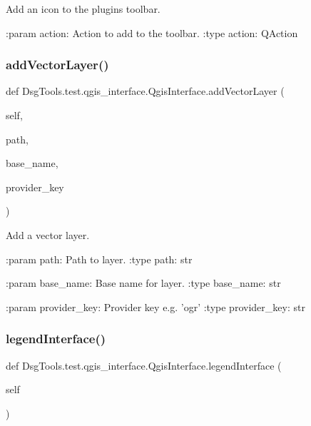 \begin{DoxyVerb}Add an icon to the plugins toolbar.

:param action: Action to add to the toolbar.
:type action: QAction
\end{DoxyVerb}
 \mbox{\label{class_dsg_tools_1_1test_1_1qgis__interface_1_1_qgis_interface_ad95653df27b570fb359d56334141ff92}} 
\subsubsection{\texorpdfstring{add\+Vector\+Layer()}{addVectorLayer()}}
{\footnotesize\ttfamily def Dsg\+Tools.\+test.\+qgis\+\_\+interface.\+Qgis\+Interface.\+add\+Vector\+Layer (\begin{DoxyParamCaption}\item[{}]{self,  }\item[{}]{path,  }\item[{}]{base\+\_\+name,  }\item[{}]{provider\+\_\+key }\end{DoxyParamCaption})}

\begin{DoxyVerb}Add a vector layer.

:param path: Path to layer.
:type path: str

:param base_name: Base name for layer.
:type base_name: str

:param provider_key: Provider key e.g. 'ogr'
:type provider_key: str
\end{DoxyVerb}
 \mbox{\label{class_dsg_tools_1_1test_1_1qgis__interface_1_1_qgis_interface_a2e76383e327d005f13a497fc839132fd}} 
\subsubsection{\texorpdfstring{legend\+Interface()}{legendInterface()}}
{\footnotesize\ttfamily def Dsg\+Tools.\+test.\+qgis\+\_\+interface.\+Qgis\+Interface.\+legend\+Interface (\begin{DoxyParamCaption}\item[{}]{self }\end{DoxyParamCaption})}

